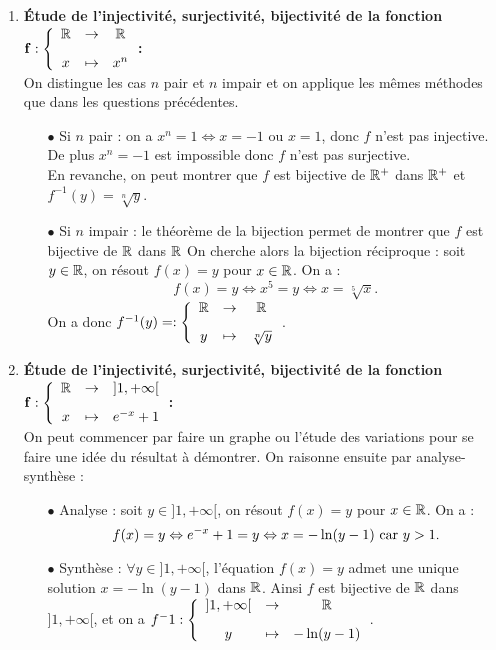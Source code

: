 \documentclass[a4paper, 11pt,reqno]{article}
\begin{document}
\begin{correction}
\begin{enumerate}
		\item  \textbf{\'Etude de l'injectivit\'e, surjectivit\'e, bijectivit\'e de la fonction $\mathbf{f:\left\lbrace\begin{array}{ccc} \R&\rightarrow& \R\vsec\\ x & \mapsto & x^n\end{array}\right.}$:}\\
		      On distingue les cas $n$ pair et $n$ impair et on applique les m\^emes m\'ethodes que dans les questions pr\'ec\'edentes.
		      \begin{itemize}
			      \item[$\bullet$] Si $n$ pair : on a $x^n=1 \Leftrightarrow x=-1$ ou $x=1$, donc $f$ n'est pas injective. De plus $x^n=-1$ est impossible donc $f$ n'est pas surjective.\\
				      En revanche, on peut montrer que $f$ est bijective de $\mathbb{R}^+$ dans $\mathbb{R}^+$ et $f^{-1}(y) = \sqrt[n]{y}$.\item[$\bullet$] Si $n$ impair : le th\'eor\`eme de la bijection permet de montrer que $f$ est bijective de $\mathbb{R}$ dans $\mathbb{R}$ On cherche alors la bijection r\'eciproque :  soit $y \in \mathbb{R}$, on r\'esout $f(x)=y$ pour $x \in \mathbb{R}$. On a :
				      $$f(x) = y \Leftrightarrow x^5= y \Leftrightarrow x=\sqrt[5]{x}.$$
				      On a donc $f^{-1}(y) = : \left\lbrace\begin{array}{ccc} \R&\rightarrow& \R\vsec\\ y & \mapsto & \sqrt[n]{y} \end{array}\right.$.
		      \end{itemize}
		\item  \textbf{\'Etude de l'injectivit\'e, surjectivit\'e, bijectivit\'e de la fonction $\mathbf{f:\left\lbrace\begin{array}{ccc} \R&\rightarrow& \rbrack 1,+\infty\lbrack \vsec\\ x & \mapsto & e^{-x}+1\end{array}\right.}$:}\\
		      On peut commencer par faire un graphe ou l'\'etude des variations pour se faire une id\'ee du r\'esultat \`a d\'emontrer. On raisonne ensuite par  analyse-synth\`ese :
		      \begin{itemize}
			      \item[$\bullet$] Analyse : soit $y \in ]1,+\infty[$, on r\'esout $f(x)=y$ pour $x \in \mathbb{R}$. On a :
				      $$f(x) = y \Leftrightarrow e^{-x}+1= y \Leftrightarrow x=-\ln(y-1)  \textmd{ car }  y>1.$$
			      \item[$\bullet$] Synth\`ese : $\forall y \in ]1,+\infty[$, l'\'equation $f(x)=y$ admet une unique solution $x=-\ln(y-1)$ dans $\mathbb{R}$. Ainsi $f$ est bijective de $\mathbb{R}$ dans $]1,+\infty[$, et on a $f^-1 : \left\lbrace\begin{array}{ccc} ]1,+\infty[&\rightarrow& \R\vsec\\ y & \mapsto & -\ln(y-1) \end{array}\right.$.

\end{itemize}
\end{enumerate}
\end{correction}
\end{document}
